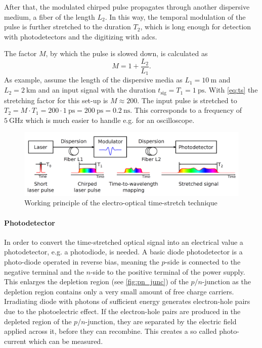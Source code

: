 After that, the modulated chirped pulse propagates through another dispersive medium, a fiber of the length $L_2$.
In this way, the temporal modulation of the pulse is further stretched to the duration $T_2$, which is long enough for detection with photodetectors and the digitizing with \Glspl{adc}. \cite{roussel2014} 

The factor $M$, by which the pulse is slowed down, is calculated as
\begin{equation}\label{eq:ts}
	M = 1 + \frac{L_2}{L_1}.
\end{equation}
As example, assume the length of the dispersive media as $L_1 = \SI{10}{\meter}$ and $L_2 = \SI{2}{\kilo \meter}$ and an input signal with the duration $t_\text{sig} = T_1 = \SI{1}{\pico \second}$. 
With \autoref{eq:ts} the stretching factor for this set-up is $M \approx 200$. The input pulse is stretched to $T_2 = M \cdot T_1 = 200 \cdot \SI{1}{\pico \second} = \SI{200}{\pico \second} = \SI{0.2}{\nano \second}$.
This corresponds to a frequency of $\SI{5}{\GHz}$ which is much easier to handle e.g. for an oscilloscope.

\begin{figure}[tbh]
	\centering
	\includegraphics[width = \textwidth]{chap/02-theory/img/time_stretch.png}
	\caption{Working principle of the electro-optical time-stretch technique \cite{roussel2014}}
	\label{fig:eo_ts}
\end{figure}

\paragraph{Photodetector}
In order to convert the time-stretched optical signal into an electrical value a photodetector, e.g. a photodiode, is needed.
A basic diode photodetector is a photo-diode operated in reverse bias, meaning the $p$-side is connected to the negative terminal and the $n$-side to the positive terminal of the power supply. %
This enlarges the depletion region (see \autoref{fig:pn_junc}) of the $p/n$-junction as the depletion region contains only a very small amount of free charge carriers. 
Irradiating diode with photons of sufficient energy generates electron-hole pairs due to the photoelectric effect. %
If the electron-hole pairs are produced in the depleted region of the $p/n$-junction, they are separated by the electric field applied across it, before they can recombine. 
This creates a so called photo-current which can be measured. \cite{photodiode} %

